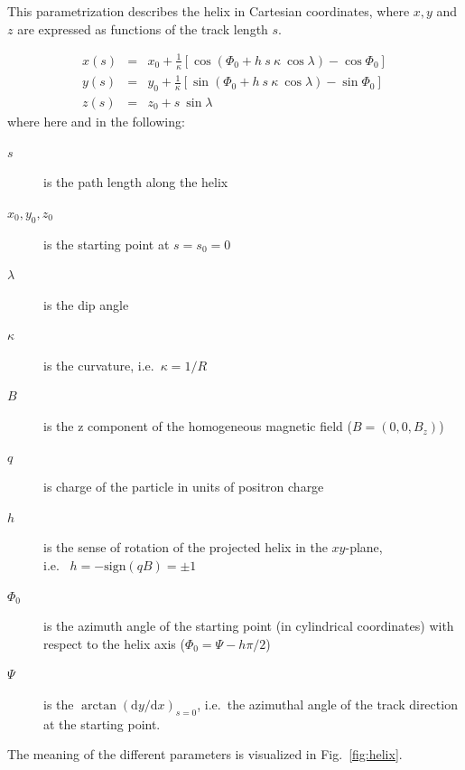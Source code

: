 \documentclass[twoside]{article}
\begin{document}
\begin{description}
This parametrization describes the helix in Cartesian coordinates,
where $x, y$ and $z$ are expressed as functions of the track length
$s$.

\begin{eqnarray}
    x(s) & = & x_0 + \frac{1}{\kappa} [\cos(\Phi_0 + h\ s\ \kappa\ \cos\lambda) - \cos\Phi_0] \label{eq:xs} \\
    y(s) & = & y_0 + \frac{1}{\kappa} [\sin(\Phi_0 + h\ s\ \kappa\ \cos\lambda) - \sin\Phi_0] \label{eq:ys} \\
    z(s) & = & z_0 + s\ \sin\lambda \label{eq:zs}
\end{eqnarray}
where here and in the following:
\begin{description}
\item[$s$] is the path length along the helix
\item[$x_0, y_0, z_0$] is the starting point at $s = s_0 = 0$
\item[$\lambda$] is the dip angle
\item[$\kappa$] is the curvature, i.e.~$\kappa = 1/R$
\item[$B$] is the z component of the homogeneous magnetic field ($B = (0, 0, B_z)$)
\item[$q$] is charge of the particle in units of positron charge
\item[$h$] is the sense of rotation of the projected helix in the $xy$-plane,\\
           i.e.~ $h = -\mathrm{sign}(q B) = \pm 1$
\item[$\Phi_0$] is the azimuth angle of the starting point (in
                cylindrical coordinates) with respect to the helix axis ($\Phi_0 =
                \Psi - h \pi/2$)
\item[$\Psi$] is the $\arctan(\mathrm{d}y/\mathrm{d}x)_{s = 0}$,
              i.e.~the azimuthal angle of the track direction at the starting point.
\end{description}
The meaning of the different parameters is visualized in Fig.~\ref{fig:helix}.


\end{description}
\end{document}
